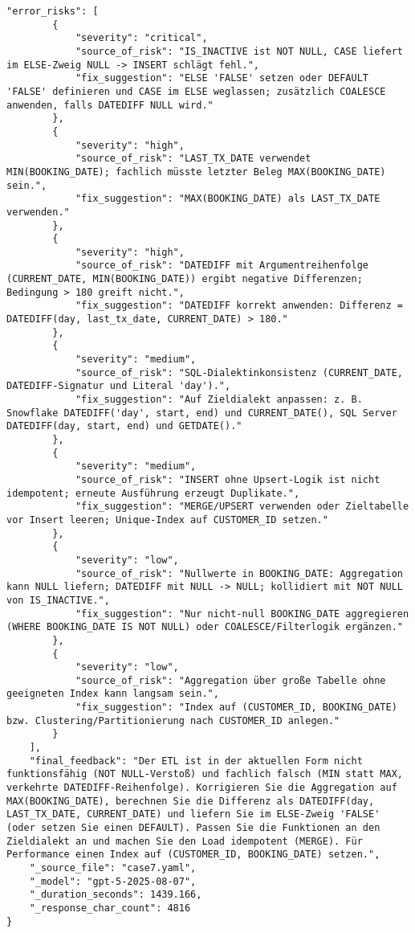 \begin{lstlisting}[caption={Ausgabe: GPT-5 Anwendungsfall 7 Konsistenzdurchlauf},label={gpt_case7_prompt2}]
    "error_risks": [
        {
            "severity": "critical",
            "source_of_risk": "IS_INACTIVE ist NOT NULL, CASE liefert im ELSE-Zweig NULL -> INSERT schlägt fehl.",
            "fix_suggestion": "ELSE 'FALSE' setzen oder DEFAULT 'FALSE' definieren und CASE im ELSE weglassen; zusätzlich COALESCE anwenden, falls DATEDIFF NULL wird."
        },
        {
            "severity": "high",
            "source_of_risk": "LAST_TX_DATE verwendet MIN(BOOKING_DATE); fachlich müsste letzter Beleg MAX(BOOKING_DATE) sein.",
            "fix_suggestion": "MAX(BOOKING_DATE) als LAST_TX_DATE verwenden."
        },
        {
            "severity": "high",
            "source_of_risk": "DATEDIFF mit Argumentreihenfolge (CURRENT_DATE, MIN(BOOKING_DATE)) ergibt negative Differenzen; Bedingung > 180 greift nicht.",
            "fix_suggestion": "DATEDIFF korrekt anwenden: Differenz = DATEDIFF(day, last_tx_date, CURRENT_DATE) > 180."
        },
        {
            "severity": "medium",
            "source_of_risk": "SQL-Dialektinkonsistenz (CURRENT_DATE, DATEDIFF-Signatur und Literal 'day').",
            "fix_suggestion": "Auf Zieldialekt anpassen: z. B. Snowflake DATEDIFF('day', start, end) und CURRENT_DATE(), SQL Server DATEDIFF(day, start, end) und GETDATE()."
        },
        {
            "severity": "medium",
            "source_of_risk": "INSERT ohne Upsert-Logik ist nicht idempotent; erneute Ausführung erzeugt Duplikate.",
            "fix_suggestion": "MERGE/UPSERT verwenden oder Zieltabelle vor Insert leeren; Unique-Index auf CUSTOMER_ID setzen."
        },
        {
            "severity": "low",
            "source_of_risk": "Nullwerte in BOOKING_DATE: Aggregation kann NULL liefern; DATEDIFF mit NULL -> NULL; kollidiert mit NOT NULL von IS_INACTIVE.",
            "fix_suggestion": "Nur nicht-null BOOKING_DATE aggregieren (WHERE BOOKING_DATE IS NOT NULL) oder COALESCE/Filterlogik ergänzen."
        },
        {
            "severity": "low",
            "source_of_risk": "Aggregation über große Tabelle ohne geeigneten Index kann langsam sein.",
            "fix_suggestion": "Index auf (CUSTOMER_ID, BOOKING_DATE) bzw. Clustering/Partitionierung nach CUSTOMER_ID anlegen."
        }
    ],
    "final_feedback": "Der ETL ist in der aktuellen Form nicht funktionsfähig (NOT NULL-Verstoß) und fachlich falsch (MIN statt MAX, verkehrte DATEDIFF-Reihenfolge). Korrigieren Sie die Aggregation auf MAX(BOOKING_DATE), berechnen Sie die Differenz als DATEDIFF(day, LAST_TX_DATE, CURRENT_DATE) und liefern Sie im ELSE-Zweig 'FALSE' (oder setzen Sie einen DEFAULT). Passen Sie die Funktionen an den Zieldialekt an und machen Sie den Load idempotent (MERGE). Für Performance einen Index auf (CUSTOMER_ID, BOOKING_DATE) setzen.",
    "_source_file": "case7.yaml",
    "_model": "gpt-5-2025-08-07",
    "_duration_seconds": 1439.166,
    "_response_char_count": 4816
}
\end{lstlisting}

